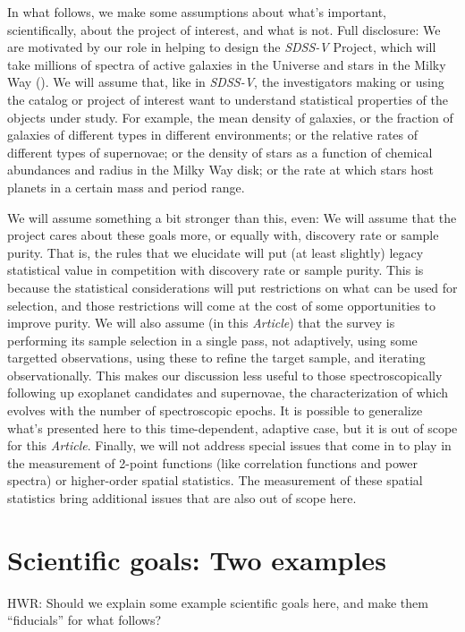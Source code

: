 \documentclass[modern]{aastex62}
\newcommand{\documentname}{\textsl{Article}}
\newcommand{\project}[1]{\textsl{#1}}
\begin{document}
In what follows, we make some assumptions about what's important,
scientifically, about the project of interest, and what is not.
Full disclosure: We are motivated by our role in helping to design the
\project{SDSS-V} Project, which will take millions of spectra of
active galaxies in the Universe and stars in the Milky Way
(\citealt{sdssv}).
We will assume that, like in \project{SDSS-V}, the investigators
making or using the catalog or project of interest want to understand
statistical properties of the objects under study.
For example, the mean density of galaxies, or the fraction of galaxies
of different types in different environments;
or the relative rates of different types of supernovae;
or the density of stars as a function of chemical abundances and radius in the Milky Way disk;
or the rate at which stars host planets in a certain mass and period range.

We will assume something a bit stronger than this, even:
We will assume that the project cares about these goals more,
or equally with, discovery rate or sample purity.
That is, the rules that we elucidate will put (at least slightly)
legacy statistical value in competition with discovery rate or sample
purity.
This is because the statistical considerations will put restrictions
on what can be used for selection, and those restrictions will come at
the cost of some opportunities to improve purity.
We will also assume (in this \documentname) that the survey is performing
its sample selection in a single pass, not adaptively, using some
targetted observations, using these to refine the target sample, and
iterating observationally.
This makes our discussion less useful to those spectroscopically following up exoplanet
candidates and supernovae, the characterization of which evolves with
the number of spectroscopic epochs.
It is possible to generalize what's presented here to this time-dependent, adaptive
case, but it is out of scope for this \documentname.
Finally, we will not address special issues that come in to play in the
measurement of 2-point functions (like correlation functions and power
spectra) or higher-order spatial statistics.
The measurement of these spatial statistics bring additional issues
that are also out of scope here.

\section{Scientific goals: Two examples}

HWR: Should we explain some example scientific goals here, and make
them ``fiducials'' for what follows?
\end{document}
